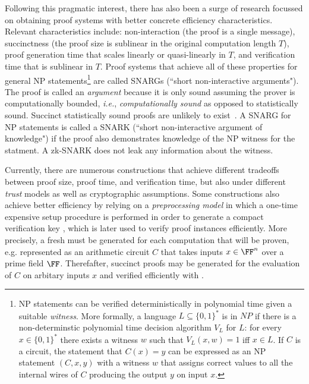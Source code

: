 Following this pragmatic interest, there has also been a surge of research focussed on obtaining proof systems with better concrete efficiency characteristics. Relevant characteristics include: non-interaction (the proof is a single message), succinctness (the proof size is sublinear in the original computation length $T$), proof generation time that scales linearly or quasi-linearly in $T$, and verification time that is sublinear in $T$. Proof systems that achieve all of these properties for general NP statements\footnote{NP statements can be verified deterministically in polynomial time given a suitable \emph{witness}. More formally, a language $L \subseteq \{0,1\}^*$ is in $NP$ if there is a non-determinstic polynomial time decision algorithm $V_L$ for $L$: for every $x \in \{0,1\}^*$ there exists a witness $w$ such that $V_L(x, w) = 1$ iff $x \in L$. If $C$ is a circuit, the statement that $C(x) = y$ can be expressed as an NP statement $(C, x, y)$ with a witness $w$ that assigns correct values to all the internal wires of $C$ producing the output $y$ on input $x$.} are called SNARGs (``short non-interactive arguments"). 
The proof is called an \emph{argument} because it is only sound assuming the prover is computationally bounded, \emph{i.e.}, \emph{computationally sound} as opposed to statistically sound. Succinct statistically sound proofs are unlikely to exist~\cite{CC:GolVadWig02,ICALP:Wee05}. 
A SNARG for NP statements is called a SNARK (``short non-interactive argument of knowledge") if the proof also demonstrates knowledge of the NP witness for the statment. A zk-SNARK does not leak any information about the witness. 


Currently, there are numerous constructions that achieve different tradeoffs between proof size, proof time, and verification time, but also under different \emph{trust} models as well as cryptographic assumptions. %
Some constructions also achieve better efficiency by relying on a \emph{preprocessing model} in which a one-time expensive setup procedure is performed in order to generate a compact verification key , which is later used to verify proof instances efficiently. More precisely, a fresh  must be generated for each computation that will be proven, e.g. represented as an arithmetic circuit $C$ that takes inputs $x \in \FF^n$ over a prime field $\FF$. Therefafter, succinct proofs may be generated for the evaluation of $C$ on arbitary inputs $x$ and verified efficiently with . 

